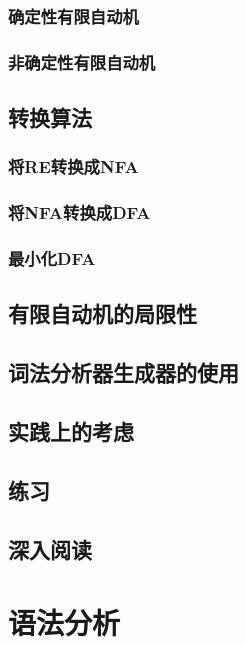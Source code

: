 \documentclass[cn,11pt,chinese]{elegantbook}
\begin{document}
\subsection{确定性有限自动机}

\subsection{非确定性有限自动机}

\section{转换算法}

\subsection{将RE转换成NFA}

\subsection{将NFA转换成DFA}

\subsection{最小化DFA}

\section{有限自动机的局限性}

\section{词法分析器生成器的使用}

\section{实践上的考虑}

\section{练习}

\section{深入阅读}

\chapter{语法分析}
\end{document}
